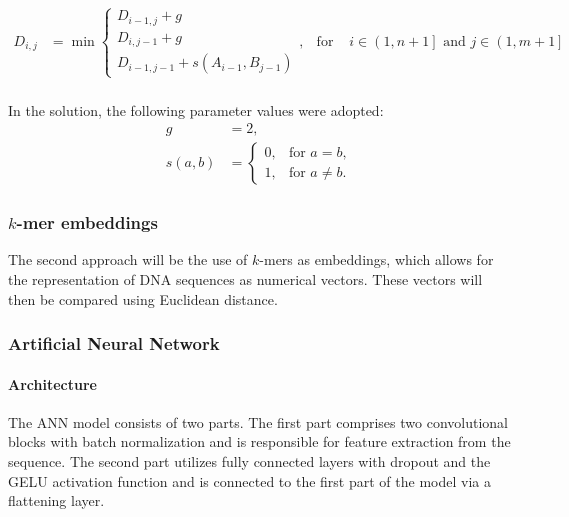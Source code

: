 \documentclass[pdflatex,sn-vancouver-num]{sn-jnl}%
\begin{document}
                \begin{equation}
                    \begin{aligned}
                        D_{i,j} &= \min
                        \begin{cases}
                        D_{i - 1, j} + g \\
                        D_{i, j - 1} + g \\
                        D_{i - 1, j - 1} + s(A_{i - 1}, B_{j - 1})
                        \end{cases}, & \text{for } & i \in \left(1, n + 1\right] \text{ and } j \in \left(1, m + 1\right] \\
                    \end{aligned}
                    \label{Equation:NeedlemanWunschModified}
                \end{equation}

                In the solution, the following parameter values were adopted:
                \begin{align*}
                    g &= 2, \\
                    s(a, b) &= \begin{cases}
                        0, & \text{for } a = b, \\
                        1, & \text{for } a \neq b.
                    \end{cases}
                \end{align*}

            \subsubsection{$k$-mer embeddings}
                The second approach will be the use of $k$-mers as embeddings, which allows for the representation of DNA sequences as numerical vectors. These vectors will then be compared using Euclidean distance.
                
            \subsubsection{Artificial Neural Network}
                \paragraph{Architecture}
                The ANN model consists of two parts. The first part comprises two convolutional blocks with batch normalization and is responsible for feature extraction from the sequence. The second part utilizes fully connected layers with dropout and the GELU activation function \cite{Hendrycks:2016} and is connected to the first part of the model via a flattening layer.
\end{document}
